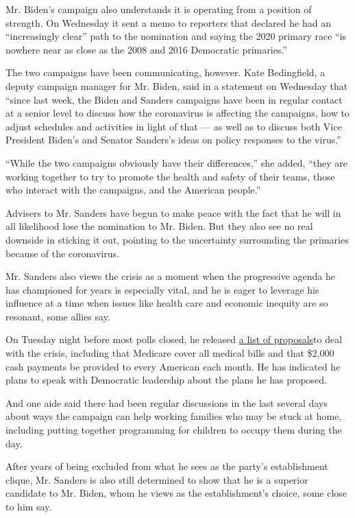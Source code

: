 Mr. Biden's campaign also understands it is operating from a position of
strength. On Wednesday it sent a memo to reporters that declared he had
an ``increasingly clear'' path to the nomination and saying the 2020
primary race ``is nowhere near as close as the 2008 and 2016 Democratic
primaries.''

The two campaigns have been communicating, however. Kate Bedingfield, a
deputy campaign manager for Mr. Biden, said in a statement on Wednesday
that ``since last week, the Biden and Sanders campaigns have been in
regular contact at a senior level to discuss how the coronavirus is
affecting the campaigns, how to adjust schedules and activities in light
of that --- as well as to discuss both Vice President Biden's and
Senator Sanders's ideas on policy responses to the virus.''

``While the two campaigns obviously have their differences,'' she added,
``they are working together to try to promote the health and safety of
their teams, those who interact with the campaigns, and the American
people.''

Advisers to Mr. Sanders have begun to make peace with the fact that he
will in all likelihood lose the nomination to Mr. Biden. But they also
see no real downside in sticking it out, pointing to the uncertainty
surrounding the primaries because of the coronavirus.

Mr. Sanders also views the crisis as a moment when the progressive
agenda he has championed for years is especially vital, and he is eager
to leverage his influence at a time when issues like health care and
economic inequity are so resonant, some allies say.

On Tuesday night before most polls closed, he released
\href{https://berniesanders.com/issues/emergency-response-coronavirus-pandemic/}{a
list of proposals}to deal with the crisis, including that Medicare cover
all medical bills and that \$2,000 cash payments be provided to every
American each month. He has indicated he plans to speak with Democratic
leadership about the plans he has proposed.

And one aide said there had been regular discussions in the last several
days about ways the campaign can help working families who may be stuck
at home, including putting together programming for children to occupy
them during the day.

After years of being excluded from what he sees as the party's
establishment clique, Mr. Sanders is also still determined to show that
he is a superior candidate to Mr. Biden, whom he views as the
establishment's choice, some close to him say.

